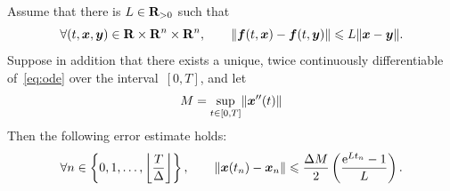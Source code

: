 \begin{theorem}
    \label{theorem:forward_euler}
    Assume that there is $L \in \mathbf R_{>0}$ such that
    \begin{equation}
        \label{eq:global_lipschitz}
        \forall (t, \vect x, \vect y) \in \real \times \real^n \times \real^n, \qquad
        \vecnorm{\vect f(t, \vect x) - \vect f(t, \vect y)}
        \leq L \vecnorm{\vect x - \vect y}.
    \end{equation}
    Suppose in addition that there exists a unique, twice continuously differentiable of~\eqref{eq:ode} over the interval~$[0, T]$,
    and let
    \[
        M = \sup_{t \in [0,T]} \lVert\mathbf{\boldsymbol{x}}''(t)\rVert
    \]
    Then the following error estimate holds:
    \begin{equation}
        \label{eq:error_bound_forward_euler}
        \forall n \in \left\{0, 1, \dotsc, \floor*{\frac{T}{\Delta}} \right\},
        \qquad
        \vecnorm{\vect x(t_n) - \vect x_n}
        \leq
        \frac{\Delta M}{2} \left( \frac{\e^{L t_n} - 1}{L} \right).
    \end{equation}
\end{theorem}
